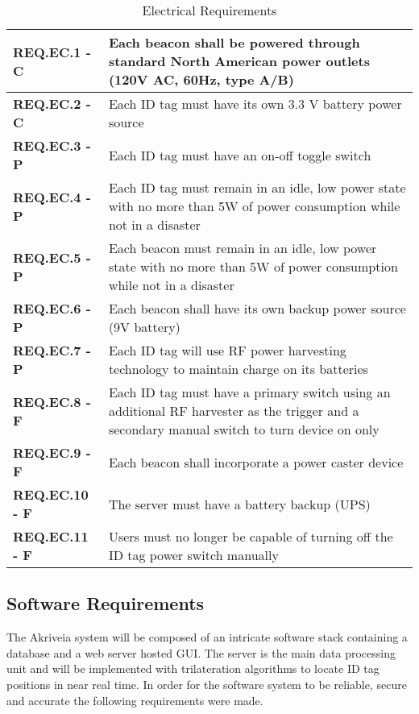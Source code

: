 \bgroup
\def\arraystretch{1.5}
\begin{table}[H]
\centering
\begin{tabular}{ | m{3.25cm} | m{12.5cm} |}
 \hline
 \textbf{REQ.EC.1 - C} & Each beacon shall be powered through standard North American power outlets (120V AC, 60Hz, type A/B) \\
\hline
 \textbf{REQ.EC.2 - C} & Each ID tag must have its own 3.3 V battery power source \\
\hline
 \textbf{REQ.EC.3 - P} & Each ID tag must have an on-off toggle switch  \\
\hline
 \textbf{REQ.EC.4 - P} &  Each ID tag must remain in an idle, low power state with no more than 5W of power consumption while not in a disaster  \\
\hline
 \textbf{REQ.EC.5 - P} &  Each beacon must remain in an idle, low power state with no more than 5W of power consumption while not in a disaster \\
\hline
 \textbf{REQ.EC.6 - P} & Each beacon shall have its own backup power source (9V battery)  \\
\hline
 \textbf{REQ.EC.7 - P} & Each ID tag will use RF power harvesting technology to maintain charge on its batteries \\
\hline
 \textbf{REQ.EC.8 - F} &  Each ID tag must have a primary switch using an additional RF harvester as the trigger and a secondary manual switch to turn device on only   \\
\hline
 \textbf{REQ.EC.9 - F} & Each beacon shall incorporate a power caster device \\
\hline
 \textbf{REQ.EC.10 - F} & The server must have a battery backup (UPS) \\
\hline
 \textbf{REQ.EC.11 - F} & Users must no longer be capable of turning off the ID tag power switch manually \\
\hline
\end{tabular}
\caption{Electrical Requirements}
\end{table}

\break
\subsection{Software Requirements}
The Akriveia system will be composed of an intricate software stack containing a database and a web server hosted GUI. The server is the main data processing unit and will be implemented with trilateration algorithms to locate ID tag positions in near real time. In order for the software system to be reliable, secure and accurate the following requirements were made.

